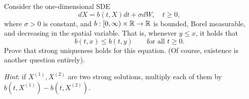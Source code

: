 \begin{exercise}
	Consider the one-dimensional SDE
	\begin{equation*}
		dX = b(t,X)dt + \sigma dW, \quad t\ge 0,
	\end{equation*}
	where $\sigma>0$ is constant, and $b:[0,\infty)\times\mathbb{R}\to\mathbb{R}$ is bounded, Borel measurable, and decreasing in the spatial variable. That is, whenever $y\le x$, it holds that
	\begin{equation*}
		b(t,x)\le b(t,y) \qquad\text{for all }t\ge 0.
	\end{equation*}
	Prove that strong uniqueness holds for this equation. (Of course, existence is another question entirely).
	
	\emph{Hint}: if $X^{(1)},X^{(2)}$ are two strong solutions, multiply each of them by $b(t,X^{(1)})-b(t,X^{(2)})$.
\end{exercise}